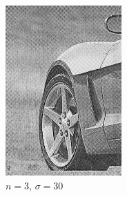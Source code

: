 \documentclass[
	12pt, %
]{style/fphw}
\begin{document}
\begin{figure}[H]
\begin{subfigure}[b]{.22\textwidth}
             \includegraphics[width=\textwidth]{Q5_3_2_30.png}
             \caption{$n=3$, $\sigma=30$}
             \label{Q5_3_3_30}
         \end{subfigure}
         \hfill
         \begin{subfigure}[b]{.22\textwidth}
             \centering

\end{subfigure}
\end{figure}
\end{document}
